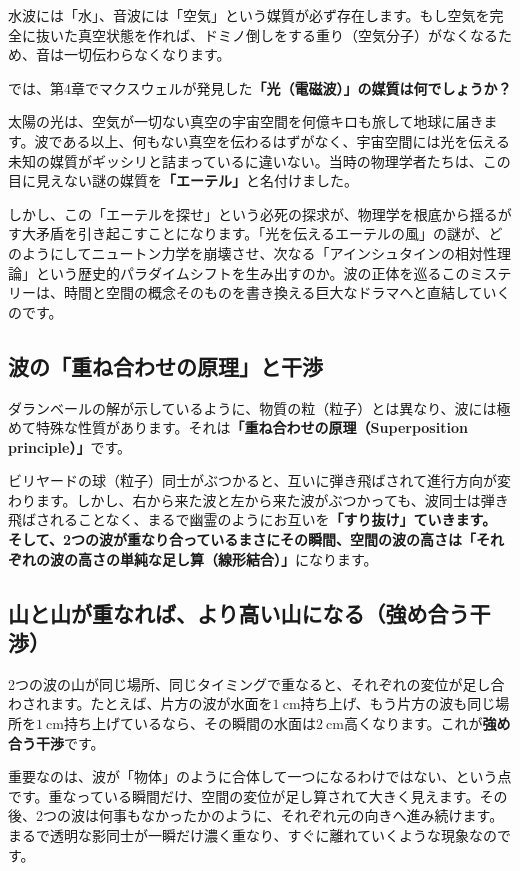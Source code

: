 水波には「水」、音波には「空気」という媒質が必ず存在します。もし空気を完全に抜いた真空状態を作れば、ドミノ倒しをする重り（空気分子）がなくなるため、音は一切伝わらなくなります。

では、第4章でマクスウェルが発見した\textbf{「光（電磁波）」の媒質は何でしょうか？}

太陽の光は、空気が一切ない真空の宇宙空間を何億キロも旅して地球に届きます。波である以上、何もない真空を伝わるはずがなく、宇宙空間には光を伝える未知の媒質がギッシリと詰まっているに違いない。当時の物理学者たちは、この目に見えない謎の媒質を\textbf{「エーテル」}と名付けました。

しかし、この「エーテルを探せ」という必死の探求が、物理学を根底から揺るがす大矛盾を引き起こすことになります。「光を伝えるエーテルの風」の謎が、どのようにしてニュートン力学を崩壊させ、次なる「アインシュタインの相対性理論」という歴史的パラダイムシフトを生み出すのか。波の正体を巡るこのミステリーは、時間と空間の概念そのものを書き換える巨大なドラマへと直結していくのです。

\subsection{波の「重ね合わせの原理」と干渉}

ダランベールの解が示しているように、物質の粒（粒子）とは異なり、波には極めて特殊な性質があります。それは\textbf{「重ね合わせの原理（Superposition principle）」}です。

ビリヤードの球（粒子）同士がぶつかると、互いに弾き飛ばされて進行方向が変わります。しかし、右から来た波と左から来た波がぶつかっても、波同士は弾き飛ばされることなく、まるで幽霊のようにお互いを\textbf{「すり抜け」ていきます。 そして、2つの波が重なり合っているまさにその瞬間、空間の波の高さは「それぞれの波の高さの単純な足し算（線形結合）」}になります。

\subsection{山と山が重なれば、より高い山になる（強め合う干渉）}

2つの波の山が同じ場所、同じタイミングで重なると、それぞれの変位が足し合わされます。たとえば、片方の波が水面を\(1\ \mathrm{cm}\)持ち上げ、もう片方の波も同じ場所を\(1\ \mathrm{cm}\)持ち上げているなら、その瞬間の水面は\(2\ \mathrm{cm}\)高くなります。これが\textbf{強め合う干渉}です。

重要なのは、波が「物体」のように合体して一つになるわけではない、という点です。重なっている瞬間だけ、空間の変位が足し算されて大きく見えます。その後、2つの波は何事もなかったかのように、それぞれ元の向きへ進み続けます。まるで透明な影同士が一瞬だけ濃く重なり、すぐに離れていくような現象なのです。


